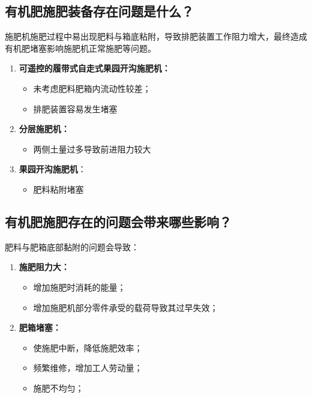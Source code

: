 \documentclass[zihao=5,UTF8,fontset=windows]{ctexart}
\begin{document}
\subsection{有机肥施肥装备存在问题是什么？}

施肥机施肥过程中易出现肥料与箱底粘附，导致排肥装置工作阻力增大，最终造成有机肥堵塞影响施肥机正常施肥等问题。

\begin{enumerate}
	\item \textbf{可遥控的履带式自走式果园开沟施肥机：}
	
    \begin{itemize}
		\item 未考虑肥料肥箱内流动性较差；
		\item 排肥装置容易发生堵塞
	\end{itemize}
	
	\item \textbf{分层施肥机：}
	
	\begin{itemize}
		\item 两侧土量过多导致前进阻力较大
	\end{itemize}
	
	\item \textbf{果园开沟施肥机}：
	
	\begin{itemize}
		\item 肥料粘附堵塞
	\end{itemize}
\end{enumerate}

\subsection{有机肥施肥存在的问题会带来哪些影响？}

肥料与肥箱底部黏附的问题会导致：

\begin{enumerate}
	\item \textbf{施肥阻力大：}

	\begin{itemize}
		\item 增加施肥时消耗的能量；
		\item 增加施肥机部分零件承受的载荷导致其过早失效；
	\end{itemize}
	
	\item \textbf{肥箱堵塞：}
	
	\begin{itemize}
		\item 使施肥中断，降低施肥效率；
		\item 频繁维修，增加工人劳动量；
		\item 施肥不均匀；
	\end{itemize}
\end{enumerate}
\end{document}
